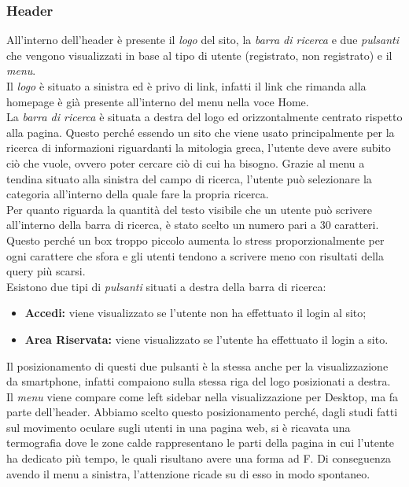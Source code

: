 \subsubsection{Header} \label{subsection:header}
All'interno dell'header è presente il \textit{logo} del sito, la \textit{barra di ricerca} e due \textit{pulsanti} che vengono visualizzati in base al tipo di utente (registrato, non registrato) e il \textit{menu}.\\
Il \textit{logo} è situato a sinistra ed è privo di link, infatti il link che rimanda alla homepage è già presente all'interno del menu nella voce Home.\\
La \textit{barra di ricerca} è situata a destra del logo ed orizzontalmente centrato rispetto alla pagina. Questo perché essendo un sito che viene usato principalmente per la ricerca di informazioni riguardanti la mitologia greca, l'utente deve avere subito ciò che vuole, ovvero poter cercare ciò di cui ha bisogno. Grazie al menu a tendina situato alla sinistra del campo di ricerca, l'utente può selezionare la categoria all'interno della quale fare la propria ricerca.\\
Per quanto riguarda la quantità del testo visibile che un utente può scrivere all'interno della barra di ricerca, è stato scelto un numero pari a 30 caratteri. Questo perché un box troppo piccolo aumenta lo stress proporzionalmente per ogni carattere che sfora e gli utenti tendono a scrivere meno con risultati della query più scarsi.\\
Esistono due tipi di \textit{pulsanti} situati a destra della barra di ricerca:
\begin{itemize}
	\item \textbf{Accedi:} viene visualizzato se l'utente non ha effettuato il login al sito;
	\item \textbf{Area Riservata:} viene visualizzato se l'utente ha effettuato il login a sito.
\end{itemize}
Il posizionamento di questi due pulsanti è la stessa anche per la visualizzazione da smartphone, infatti compaiono sulla stessa riga del logo posizionati a destra.\\
Il \textit{menu} viene compare come left sidebar nella visualizzazione per Desktop, ma fa parte dell'header. Abbiamo scelto questo posizionamento perché, dagli studi fatti sul movimento oculare sugli utenti in una pagina web, si è ricavata una termografia dove le zone calde rappresentano le parti della pagina in cui l'utente ha dedicato più tempo, le quali risultano avere una forma ad F. Di conseguenza avendo il menu a sinistra, l'attenzione ricade su di esso in modo spontaneo.\\

